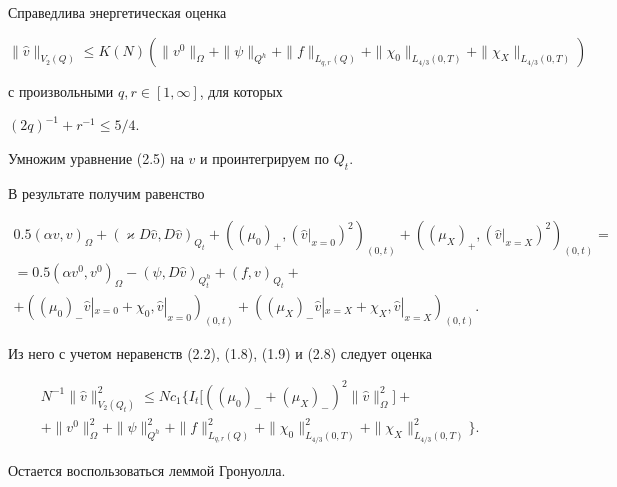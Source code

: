 \documentclass[12pt]{article}
\theoremstyle{plain} %
\newtheorem{lemm}{\hskip\parindent Лемма}[section]
\theoremstyle{definition}
\numberwithin{equation}{section}
\begin{document}
\begin{lemm} Справедлива энергетическая оценка


$$


\|\widehat v\|_{V_2(Q)} \le


K(N)(\|v^0\|_\Omega+\|\psi\|_{Q^h}+\|f\|_{L_{q,r}(Q)}+


\|\chi_0\|_{L_{4/3}(0,T)}+\|\chi_X\|_{L_{4/3}(0,T)})


$$


с произвольными $q,r\in [1,\infty]$, для которых


$(2q)^{-1}+r^{-1}\le 5/4$.


\end{lemm}





\begin{pf} Умножим уравнение (2.5) на $v$ и проинтегрируем по $Q_t$.


В результате получим равенство


\begin{gather*}


0.5(\alpha v,v)_\Omega+


(\varkappa D\widehat v,D\widehat v)_{Q_t}


+((\mu_0)_+, (\widehat v|_{x=0})^2)_{(0,t)}+


((\mu_X)_+, (\widehat v|_{x=X})^2)_{(0,t)}=\\


%


=0.5(\alpha v^0,v^0)_\Omega


-(\psi,D\widehat v)_{Q_t^h}+ (f,v)_{Q_t}+\\


%


+((\mu_0)_- \widehat v|_{x=0}+\chi_0,\widehat v|_{x=0})_{(0,t)}+


((\mu_X)_- \widehat v|_{x=X}+\chi_X,\widehat v|_{x=X})_{(0,t)}.


\end{gather*}


Из него с учетом неравенств (2.2), (1.8), (1.9) и (2.8) следует оценка


\begin{multline*}


N^{-1}\|\widehat v\|^2_{V_2(Q_t)}\le


Nc_1\bigl\{I_t\bigl[((\mu_0)_-+(\mu_X)_-)^2


\|\widehat v\|_{\Omega}^2\bigr]+\\


%


+\|v^0\|^2_\Omega+\|\psi\|^2_{Q^h}+\|f\|^2_{L_{q,r}(Q)}+


\|\chi_0\|^2_{L_{4/3}(0,T)}+\|\chi_X\|^2_{L_{4/3}(0,T)}\bigr\}.


\end{multline*}


Остается воспользоваться леммой Гронуолла.


\end{pf}
\end{document}
